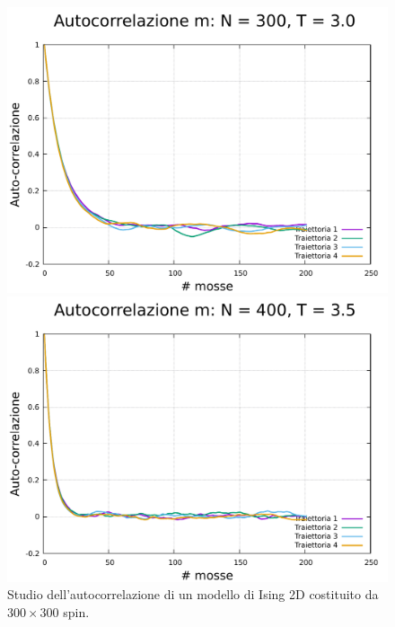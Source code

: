 \begin{figure}[htbp]
    \begin{minipage}{0.45\textwidth}  
      \centering
      \includegraphics[page=1, width=\textwidth]{Immagini/simIsing2D/metro/tcorr/auto_300_3.0.pdf}
      \caption{$T\,=\,3.0$}
    \end{minipage}\hfill
    \begin{minipage}{0.45\textwidth}  
      \centering
      \includegraphics[page=1, width=\textwidth]{Immagini/simIsing2D/metro/tcorr/auto_300_3.5.pdf}
      \caption{$T\,=\,3.5$}
    \end{minipage}
    \caption{Studio dell'autocorrelazione di un modello di Ising 2D costituito da $300 \times 300$ spin.}
\end{figure}

